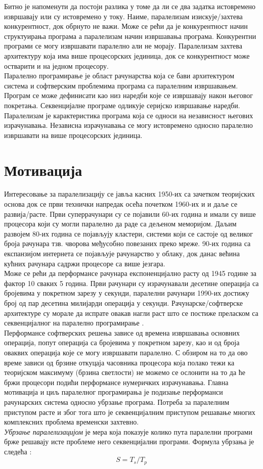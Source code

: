 \documentclass[12pt,oneside]{memoir}
\begin{document}
Битно је напоменути да постоји разлика у томе да ли се два задатка истовремено извршавају или су истовремено у току. Наиме, паралелизам изискује/захтева конкурентност, док обрнуто не важи. Може се рећи да је конкурентност начин структуирања програма а паралелизам начин извршавања програма. Конкурентни програми се могу извршавати паралелно али не морају. Паралелизам захтева архитектуру која има више процесорских јединица, док се конкурентност може остварити и на једном процесору.
	\\
 \indent 	Паралелно програмирање је област рачунарства која се бави архитектуром система и софтверским проблемима програма са паралелним извршавањем. Програм се може дефинисати као низ наредби које се извршавају након његовог покретања. Секвенцијалне програме одликује серијско извршавање наредби. Паралелизам је карактеристика програма која се односи на независност његових израчунавања. Независна израчунавања се могу истовремено односно паралелно извршавати на више процесорских јединица.
  \section{Мотивација}
  Интересовање за паралелизацију се јавља касних 1950-их са зачетком теоријских основа док се први технички напредак осећа почетком 1960-их и и даље се развија/расте. Први суперрачунари су се појавили 60-их година и имали су више процесора који су могли паралелно да раде са дељеном меморијом. Даљим развојем 80-их година се појављују кластери, системи који се састоје од великог броја рачунара тзв. чворова међусобно повезаних преко мреже. 90-их година са експанзијом интернета се појављује рачунарство у облаку, док данас већина кућних рачунара садржи процесоре са више језгара. \\
  \indent Може се рећи да перформансе рачунара експоненцијално расту од 1945 године за фактор 10 сваких 5 година. Први рачунари су израчунавали десетине операција са бројевима у покретном зарезу у секунди, паралелни рачунари 1990-их достижу број од пар десетина милијарди операција у секунди. Рачунарске/софтверске архитектуре су морале да испрате овакав нагли раст што се постиже преласком са секвенцијалног на паралелно програмирање \cite{par_history}.
  \\
 \indent Перформансе софтверских решења зависе од времена извршавања основних операција, попут операција са бројевима у покретном зарезу, као и од броја оваквих операција које се могу извршавати паралелно. С обзиром на то да ово време зависи од брзине откуцаја часовника процесора која полако тежи ка теоријском максимуму (брзина светлости) не можемо се ослонити на то да ће бржи процесори подићи перформансе нумеричких израчунавања. Главна мотивација и циљ паралелног програмирања је подизање перформанси рачунарских система односно убрзање програма. Потреба за паралелним приступом расте и због тога што је секвенцијалним приступом решавање многих комплексних проблема временски захтевно. 
 \\
\indent \emph{Убрзање паралелизацијом} је мера која показује колико пута паралелни програми брже решавају исте проблеме него секвенцијални програми. Формула убрзања је следећа \cite{par_various}:
 	$$ S = T_s/T_p $$
 	
\end{document}
